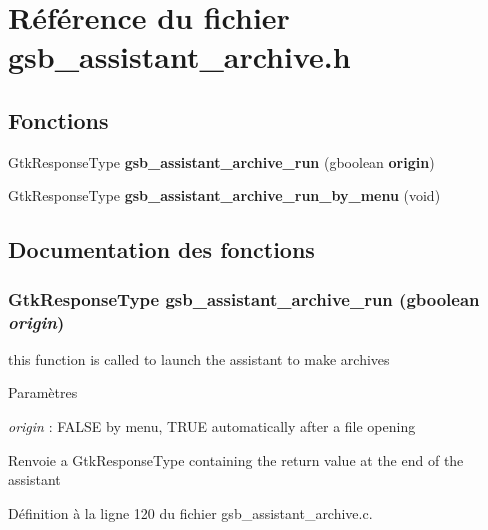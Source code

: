 \section{Référence du fichier gsb\_\-assistant\_\-archive.h}
\label{gsb__assistant__archive_8h}
\subsection*{Fonctions}
\begin{DoxyCompactItemize}
\item 
GtkResponseType {\bf gsb\_\-assistant\_\-archive\_\-run} (gboolean {\bf origin})
\item 
GtkResponseType {\bf gsb\_\-assistant\_\-archive\_\-run\_\-by\_\-menu} (void)
\end{DoxyCompactItemize}


\subsection{Documentation des fonctions}
\subsubsection[{gsb\_\-assistant\_\-archive\_\-run}]{\setlength{\rightskip}{0pt plus 5cm}GtkResponseType gsb\_\-assistant\_\-archive\_\-run (gboolean {\em origin})}\label{gsb__assistant__archive_8h_ab704558aef7214e869b6a9a3a87d0b1f}
this function is called to launch the assistant to make archives


\begin{DoxyParams}{Paramètres}
\item[{\em origin}]: FALSE by menu, TRUE automatically after a file opening\end{DoxyParams}
\begin{DoxyReturn}{Renvoie}
a GtkResponseType containing the return value at the end of the assistant 
\end{DoxyReturn}


Définition à la ligne 120 du fichier gsb\_\-assistant\_\-archive.c.

